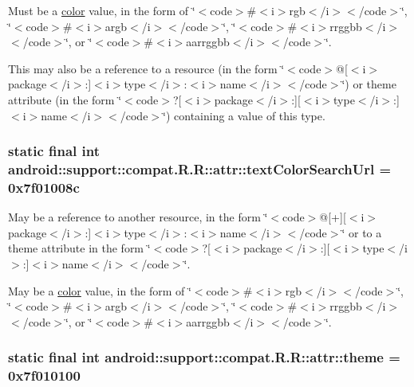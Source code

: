 Must be a \hyperlink{classandroid_1_1support_1_1compat_1_1_r_1_1color}{color} value, in the form of \char`\"{}$<$code$>$\#$<$i$>$rgb$<$/i$>$$<$/code$>$\char`\"{}, \char`\"{}$<$code$>$\#$<$i$>$argb$<$/i$>$$<$/code$>$\char`\"{}, \char`\"{}$<$code$>$\#$<$i$>$rrggbb$<$/i$>$$<$/code$>$\char`\"{}, or \char`\"{}$<$code$>$\#$<$i$>$aarrggbb$<$/i$>$$<$/code$>$\char`\"{}. 

This may also be a reference to a resource (in the form \char`\"{}$<$code$>$@\mbox{[}$<$i$>$package$<$/i$>$:\mbox{]}$<$i$>$type$<$/i$>$:$<$i$>$name$<$/i$>$$<$/code$>$\char`\"{}) or theme attribute (in the form \char`\"{}$<$code$>$?\mbox{[}$<$i$>$package$<$/i$>$:\mbox{]}\mbox{[}$<$i$>$type$<$/i$>$:\mbox{]}$<$i$>$name$<$/i$>$$<$/code$>$\char`\"{}) containing a value of this type. \hypertarget{classandroid_1_1support_1_1compat_1_1_r_1_1attr_226280960218f5f6c018b7c2b7d67d55}{
\subsubsection[{textColorSearchUrl}]{\setlength{\rightskip}{0pt plus 5cm}static final int android::support::compat.R.R::attr::textColorSearchUrl = 0x7f01008c}}
\label{classandroid_1_1support_1_1compat_1_1_r_1_1attr_226280960218f5f6c018b7c2b7d67d55}


May be a reference to another resource, in the form \char`\"{}$<$code$>$@\mbox{[}+\mbox{]}\mbox{[}$<$i$>$package$<$/i$>$:\mbox{]}$<$i$>$type$<$/i$>$:$<$i$>$name$<$/i$>$$<$/code$>$\char`\"{} or to a theme attribute in the form \char`\"{}$<$code$>$?\mbox{[}$<$i$>$package$<$/i$>$:\mbox{]}\mbox{[}$<$i$>$type$<$/i$>$:\mbox{]}$<$i$>$name$<$/i$>$$<$/code$>$\char`\"{}. 

May be a \hyperlink{classandroid_1_1support_1_1compat_1_1_r_1_1color}{color} value, in the form of \char`\"{}$<$code$>$\#$<$i$>$rgb$<$/i$>$$<$/code$>$\char`\"{}, \char`\"{}$<$code$>$\#$<$i$>$argb$<$/i$>$$<$/code$>$\char`\"{}, \char`\"{}$<$code$>$\#$<$i$>$rrggbb$<$/i$>$$<$/code$>$\char`\"{}, or \char`\"{}$<$code$>$\#$<$i$>$aarrggbb$<$/i$>$$<$/code$>$\char`\"{}. \hypertarget{classandroid_1_1support_1_1compat_1_1_r_1_1attr_ecad259a45fc791ee0f53f64697c7aab}{
\subsubsection[{theme}]{\setlength{\rightskip}{0pt plus 5cm}static final int android::support::compat.R.R::attr::theme = 0x7f010100}}
\label{classandroid_1_1support_1_1compat_1_1_r_1_1attr_ecad259a45fc791ee0f53f64697c7aab}


